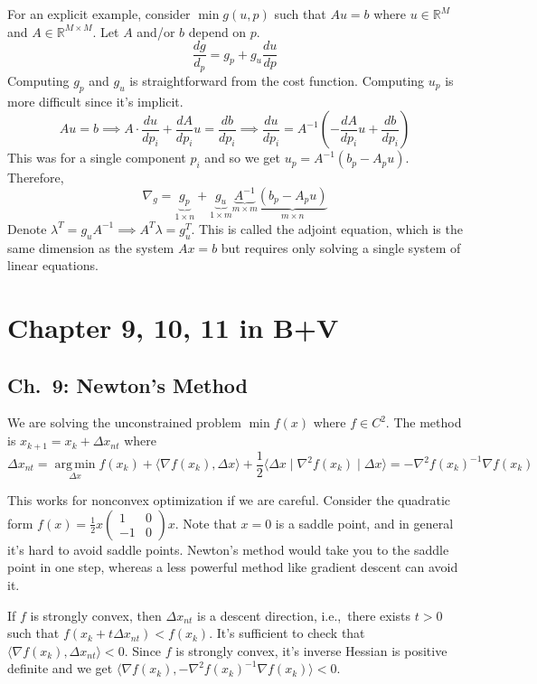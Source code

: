 \documentclass[english, 11pt]{article}
\DeclareMathOperator*{\argmin}{arg\,min}
\begin{document}
\begin{enumerate}
\begin{exmp}
For an explicit example, consider $\min g(u,p)$ such that $Au=b$ where $u \in \mathbb{R}^M$ and $A \in \mathbb{R}^{M \times M}$. Let $A$ and/or $b$ depend on $p$.
\[
\frac{dg}{d_p} = g_p + g_u \frac{du}{dp}
\]
Computing $g_p$ and $g_u$ is straightforward from the cost function. Computing $u_p$ is more difficult since it's implicit. 
\[
Au=b \implies A \cdot \frac{du}{dp_i} + \frac{dA}{dp_i}{u} = \frac{db}{dp_i} \implies \frac{du}{dp_i} = A^{-1} \left( - \frac{dA}{dp_i} u + \frac{db}{dp_i} \right)
\]
This was for a single component $p_i$ and so we get $u_p  = A^{-1} (b_p - A_p u)$. Therefore,
\[
\nabla_g = \underbrace{g_p}_{1 \times n} + \underbrace{g_u}_{1 \times m}    \underbrace{A^{-1}}_{ m \times m}  \underbrace{(b_p - A_p u) }_{ m \times n}
\]
Denote $\lambda^T = g_u A^{-1} \implies A^T \lambda = g_u^T$. This is called the adjoint equation, which is the same dimension as the system $Ax=b$ but requires only solving a single system of linear equations.
\end{exmp}


\end{enumerate}


\section{Chapter 9, 10, 11 in B+V}
\subsection{Ch.\ 9: Newton's Method}
We are solving the unconstrained problem $\min f(x)$ where $f \in C^2$. The method is $x_{k+1} = x_k + \Delta x_{nt}$ where
\[
\Delta x_{nt} = \argmin \limits_{\Delta x} f(x_k) + \langle \nabla f(x_k), \Delta x \rangle + \frac{1}{2} \langle \Delta x \mid \nabla^2 f(x_k) \mid \Delta x \rangle
= - \nabla^2 f(x_k)^{-1} \nabla f(x_k)
\]


\begin{exmp}
This works for nonconvex optimization if we are careful. Consider the quadratic form $f(x) = \frac{1}{2} x  \begin{pmatrix} 1 & 0 \\ -1 & 0 \end{pmatrix}x$. Note that $x=0$ is a saddle point, and in general it's hard to avoid saddle points. Newton's method would take you to the saddle point in one step, whereas a less powerful method like gradient descent can avoid it.
\end{exmp}

\begin{rem}
If $f$ is strongly convex, then $\Delta x_{nt}$ is a descent direction, i.e.,\ there exists $t>0$ such that $f(x_k + t \Delta x_{nt}) < f(x_k)$. It's sufficient to check that $\langle \nabla f(x_k), \Delta x_{nt} \rangle <0$. Since $f$ is strongly convex, it's inverse Hessian is positive definite and we get $\langle \nabla f(x_k), - \nabla^2 f(x_k)^{-1} \nabla f(x_k) \rangle<0.$
\end{rem}
\end{document}
